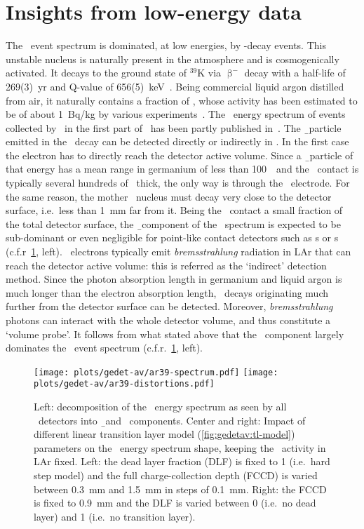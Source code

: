 \section{Insights from low-energy data}%
\label{sec:gedetav:ar39}

The \gerda\ event spectrum is dominated, at low energies, by \Arl-decay events. This
unstable nucleus is naturally present in the atmosphere and is cosmogenically activated.
It decays to the ground state of $^{39}$K via $\upbeta^-$ decay with a half-life of
269(3)~yr and Q-value of 656(5)~keV~\cite{Wang2017}. Being commercial liquid argon distilled from air, it
naturally contains a fraction of \Arl, whose activity has been estimated to be of about
1~Bq/kg by various experiments~\cite{Ajaj2019, Calvo2017, Benetti2006, Loosli1983}. The
\Arl\ energy spectrum of events collected by \gerda\ in the first part of \phasetwo\ has
been partly published in~\cite{Agostini2020}.
\newpar
The \b\ particle emitted in the \Arl\ decay can be detected directly or indirectly in
\gerda. In the first case the electron has to directly reach the detector active volume.
Since a \b\ particle of that energy has a mean range in germanium of less than 100~\mum\
and the \nplus\ contact is typically several hundreds of \mum\ thick, the only way is
through the \pplus\ electrode. For the same reason, the mother \Arl\ nucleus must decay
very close to the detector surface, i.e.~less than 1~mm far from it. Being the \pplus\
contact a small fraction of the total detector surface, the \b\ component of the \Arl\
spectrum is expected to be sub-dominant or even negligible for point-like contact
detectors such as \bege{}s or \icoax{}s (c.f.r~\cref{fig:gedetav:ar39:distortions}, left).
\newpar
\Arl\ electrons typically emit \emph{bremsstrahlung} radiation in LAr that can reach the
detector active volume: this is referred as the `indirect' detection method. Since the
photon absorption length in germanium and liquid argon is much longer than the electron
absorption length, \Arl\ decays originating much further from the detector surface can be
detected. Moreover, \emph{bremsstrahlung} photons can interact with the whole detector
volume, and thus constitute a `volume probe'. It follows from what stated above that the
\g\ component largely dominates the \Arl\ event spectrum
(c.f.r.~\cref{fig:gedetav:ar39:distortions}, left).

\begin{figure}
  \centering
  \texttt{[image: plots/gedet-av/ar39-spectrum.pdf]}%
  \texttt{[image: plots/gedet-av/ar39-distortions.pdf]}
  \caption{%
    Left: decomposition of the \Arl\ energy spectrum as seen by all \gerda\ detectors into
    \b\ and \g\ components. Center and right: Impact of different linear transition layer
    model (\cref{fig:gedetav:tl-model}) parameters on the \Arl\ energy spectrum shape,
    keeping the \Arl\ activity in LAr fixed. Left: the dead layer fraction (DLF) is fixed
    to 1 (i.e.~hard step model) and the full charge-collection depth (FCCD) is varied
    between 0.3~mm and 1.5~mm in steps of 0.1~mm. Right: the FCCD is fixed to 0.9~mm and
    the DLF is varied between 0 (i.e.~no dead layer) and 1 (i.e.~no transition layer).
  }\label{fig:gedetav:ar39:distortions}
\end{figure}

